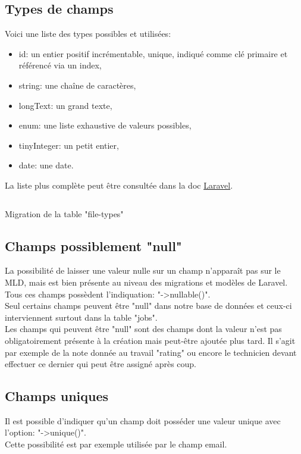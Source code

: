 \documentclass[
    iai, %
    il, %
]{heig-tb}
\begin{document}
\subsection{Types de champs}
Voici une liste des types possibles et utilisées:
\begin{itemize}
    \item id: un entier positif incrémentable, unique, indiqué comme clé primaire et référencé via un index,
    \item string: une chaîne de caractères,
    \item longText: un grand texte,
    \item enum: une liste exhaustive de valeurs possibles,
    \item tinyInteger: un petit entier,
    \item date: une date.
\end{itemize}

La liste plus complète peut être consultée dans la doc \href{https://laravel.com/docs/9.x/migrations#available-column-types}{Laravel}.

\begin{listing}[h]
    \inputminted{php}{assets/code/12_create_file_types_table.php}
    \caption{Migration de la table "file-types" \label{migrations-file-types}}
\end{listing}

\subsection{Champs possiblement "null"}
La possibilité de laisser une valeur nulle sur un champ n'apparaît pas sur le MLD, mais est bien présente au niveau des migrations et modèles de Laravel.\\
Tous ces champs possèdent l'indiquation: "->nullable()".\\
Seul certains champs peuvent être "null" dans notre base de données et ceux-ci interviennent surtout dans la table "jobs".\\
Les champs qui peuvent être "null" sont des champs dont la valeur n'est pas obligatoirement présente à la création mais peut-être ajoutée plus tard. Il s'agit par exemple de la note donnée au travail "rating" ou encore le technicien devant effectuer ce dernier qui peut être assigné après coup.

\subsection{Champs uniques}
Il est possible d'indiquer qu'un champ doit posséder une valeur unique avec l'option: "->unique()".\\
Cette possibilité est par exemple utilisée par le champ email.
\end{document}
